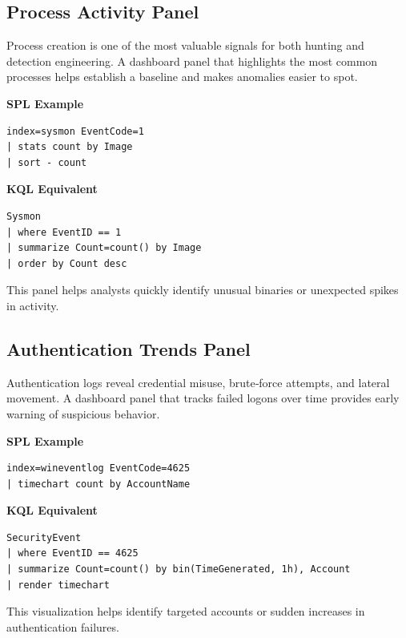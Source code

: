 \subsection*{Process Activity Panel}

Process creation is one of the most valuable signals for both hunting and detection engineering. A dashboard panel 
that highlights the most common processes helps establish a baseline and makes anomalies easier to spot.

\textbf{SPL Example}

\begin{lstlisting}
index=sysmon EventCode=1
| stats count by Image
| sort - count
\end{lstlisting}

\textbf{KQL Equivalent}

\begin{lstlisting}
Sysmon
| where EventID == 1
| summarize Count=count() by Image
| order by Count desc
\end{lstlisting}

This panel helps analysts quickly identify unusual binaries or unexpected spikes in activity.


\subsection*{Authentication Trends Panel}

Authentication logs reveal credential misuse, brute‑force attempts, and lateral movement. A dashboard panel that 
tracks failed logons over time provides early warning of suspicious behavior.

\textbf{SPL Example}

\begin{lstlisting}
index=wineventlog EventCode=4625
| timechart count by AccountName
\end{lstlisting}

\textbf{KQL Equivalent}

\begin{lstlisting}
SecurityEvent
| where EventID == 4625
| summarize Count=count() by bin(TimeGenerated, 1h), Account
| render timechart
\end{lstlisting}

This visualization helps identify targeted accounts or sudden increases in authentication failures.

